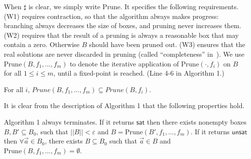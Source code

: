\documentclass[envcountsect]{llncs}
\begin{document}
When $\sharp$ is clear, we simply write $\mathrm{Prune}$. It specifies the following requirements. (W1) requires contraction, so that the algorithm always makes progress: branching always decreases the size of boxes, and pruning never increases them. (W2) requires that the result of a pruning is always a reasonable box that may contain a zero. Otherwise $B$ should have been pruned out. (W3) ensures that the real solutions are never discarded in pruning (called ``completeness'' in~\cite{handbookICP}). 
We use $\mathrm{Prune}(B, f_1,...,f_m)$ to denote the iterative application of $\mathrm{Prune}(\cdot, f_i)$ on $B$ for all $1\leq i\leq m$, until a fixed-point is reached. (Line 4-6 in Algorithm 1.)
\begin{proposition}
For all $i$, $Prune(B,f_1,...,f_m)\subseteq Prune(B,f_i)$. 
\end{proposition}

It is clear from the description of Algorithm 1 that the following properties hold.
\begin{lemma}\label{key-lemma}
Algorithm 1 always terminates. If it returns $\mathsf{sat}$ then there exists nonempty boxes $B,B'\subseteq B_0$, such that $||B||<\varepsilon$ and $B=\mathrm{Prune}(B',f_1,...,f_m)$. If it returns $\mathsf{unsat}$ then $\forall\vec a\in B_0$, there exists $B\subseteq B_0$ such that $\vec a\in B$ and $\mathrm{Prune}(B,f_1,...,f_m)= \emptyset$. 
\end{lemma}
\end{document}
